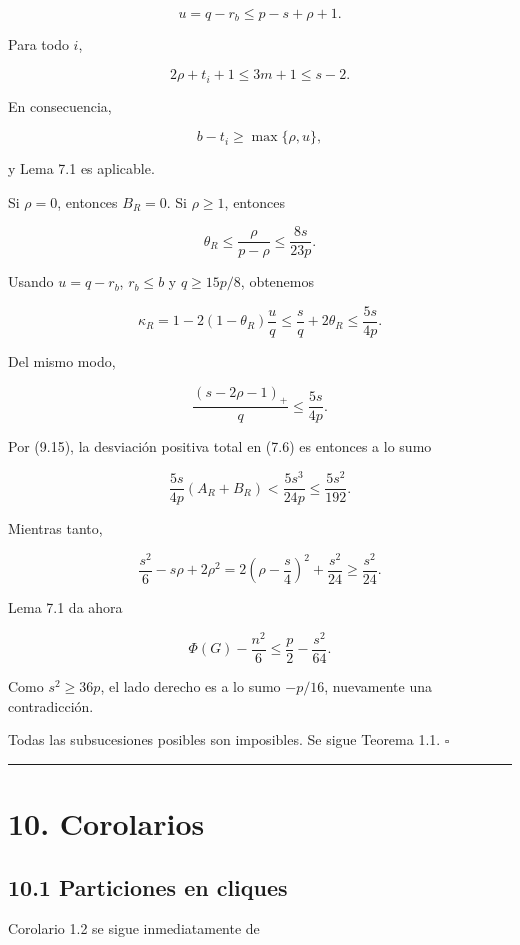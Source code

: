 \documentclass[
  11pt,
]{article}
\begin{document}
\[
u=q-r_b\le p-s+\rho+1.
\]

Para todo \(i\),

\[
2\rho+t_i+1
\le
3m+1
\le
s-2.
\]

En consecuencia,

\[
b-t_i\ge\max\{\rho,u\},
\]

y Lema 7.1 es aplicable.

Si \(\rho=0\), entonces \(B_R=0\). Si \(\rho\ge1\), entonces

\[
\theta_R
\le
\frac{\rho}{p-\rho}
\le
\frac{8s}{23p}.
\]

Usando \(u=q-r_b\), \(r_b\le b\) y \(q\ge15p/8\), obtenemos

\[
\kappa_R
=1-2(1-\theta_R)\frac uq
\le
\frac sq+2\theta_R
\le
\frac{5s}{4p}.
\tag{9.16}
\]

Del mismo modo,

\[
\frac{(s-2\rho-1)_+}{q}
\le
\frac{5s}{4p}.
\tag{9.17}
\]

Por (9.15), la desviación positiva total en (7.6) es entonces a lo sumo

\[
\frac{5s}{4p}(A_R+B_R)
<
\frac{5s^3}{24p}
\le
\frac{5s^2}{192}.
\tag{9.18}
\]

Mientras tanto,

\[
\frac{s^2}{6}-s\rho+2\rho^2
=
2\left(\rho-\frac s4\right)^2+\frac{s^2}{24}
\ge
\frac{s^2}{24}.
\tag{9.19}
\]

Lema 7.1 da ahora

\[
\Phi(G)-\frac{n^2}{6}
\le
\frac p2-\frac{s^2}{64}.
\tag{9.20}
\]

Como \(s^2\ge36p\), el lado derecho es a lo sumo \(-p/16\), nuevamente
una contradicción.

Todas las subsucesiones posibles son imposibles. Se sigue Teorema 1.1.
\(\square\)

\begin{center}\rule{0.5\linewidth}{0.5pt}\end{center}

\section{10. Corolarios}\label{corolarios}

\subsection{10.1 Particiones en cliques}\label{particiones-en-cliques}

Corolario 1.2 se sigue inmediatamente de
\end{document}
